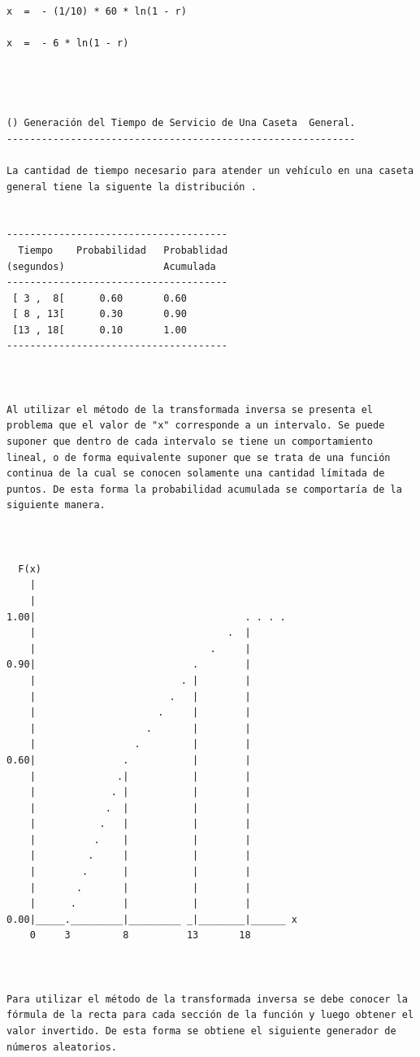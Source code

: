\begin{verbatim}
x  =  - (1/10) * 60 * ln(1 - r)

x  =  - 6 * ln(1 - r)




() Generación del Tiempo de Servicio de Una Caseta  General.
------------------------------------------------------------

La cantidad de tiempo necesario para atender un vehículo en una caseta general tiene la siguente la distribución .


--------------------------------------
  Tiempo    Probabilidad   Probablidad
(segundos)                 Acumulada
--------------------------------------
 [ 3 ,  8[      0.60       0.60
 [ 8 , 13[      0.30       0.90
 [13 , 18[      0.10       1.00
--------------------------------------



Al utilizar el método de la transformada inversa se presenta el problema que el valor de "x" corresponde a un intervalo. Se puede suponer que dentro de cada intervalo se tiene un comportamiento lineal, o de forma equivalente suponer que se trata de una función continua de la cual se conocen solamente una cantidad límitada de puntos. De esta forma la probabilidad acumulada se comportaría de la siguiente manera.



  F(x)
    |
    |
1.00|                                    . . . .
    |                                 .  |
    |                              .     |
0.90|                           .        |
    |                         . |        |
    |                       .   |        |
    |                     .     |        |
    |                   .       |        |
    |                 .         |        |
0.60|               .           |        |
    |              .|           |        |
    |             . |           |        |
    |            .  |           |        |
    |           .   |           |        |
    |          .    |           |        |
    |         .     |           |        |
    |        .      |           |        |
    |       .       |           |        |
    |      .        |           |        |
0.00|_____._________|_________ _|________|______ x
    0     3         8          13       18



Para utilizar el método de la transformada inversa se debe conocer la fórmula de la recta para cada sección de la función y luego obtener el valor invertido. De esta forma se obtiene el siguiente generador de números aleatorios.



\end{verbatim}
